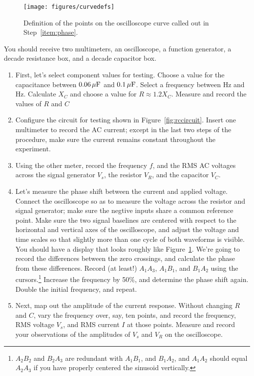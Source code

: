 \documentclass[12pt]{article}
\begin{document}
\begin{figure}
  \centering
 \texttt{[image: figures/curvedefs]} 
  \caption{Definition of the points on the oscilloscope curve called
    out in Step~\ref{item:phase}.} 
  \label{fig:curvedefs}
\end{figure}
You should receive two multimeters, an oscilloscope, a function
generator, a decade resistance box, and a decade capacitor box.

\begin{enumerate}
\item First, let's select component values for testing.  Choose a
  value for the capacitance between $\unit[0.06]{\mu F}$ and
  $\unit[0.1]{\mu F}$.  Select a frequency between \unit[300]{Hz} and
  \unit[600]{Hz}.  Calculate $X_C$ and choose a value for $R \approx
  1.2 X_C$.  Measure and record the values of $R$ and $C$
\item Configure the circuit for testing shown in
  Figure~\ref{fig:rccircuit}.  Insert one multimeter to record the AC
  current; except in the last two steps of the procedure, make sure
  the current remains constant throughout the experiment.
\item Using the other meter, record the frequency $f$, and the RMS AC
  voltages across the signal generator $V_s$, the resistor $V_R$, and
  the capacitor $V_C$.
\item \label{item:phase} Let's measure the phase shift between the
  current and applied voltage.  Connect the oscilloscope so as to
  measure the voltage across the resistor and signal generator; make
  sure the negtive inputs share a common reference point.  Make sure
  the two signal baselines are centered with respect to the horizontal
  and vertical axes of the oscilloscope, and adjust the voltage and
  time scales so that slightly more than one cycle of both waveforms
  is visible.  You should have a display that looks roughly like
  Figure~\ref{fig:curvedefs}.  We're going to record the differences
  between the zero crossings, and calculate the phase from these
  differences.  Record (at least!) $A_1A_3$, $A_1B_1$, and $B_1A_2$
  using the cursors.\footnote{$A_2B_2$ and $B_2A_3$ are redundant with
    $A_1B_1$, and $B_1A_2$, and $A_1A_2$ should equal $A_2A_3$ if you
    have properly centered the sinusoid vertically.}  Increase the
  frequency by 50\%, and determine the phase shift again.  Double the
  initial frequency, and repeat.
\item \label{item:current} Next, map out the amplitude of the current
  response.  Without changing $R$ and $C$, vary the frequency over,
  say, ten points, and record the frequency, RMS voltage $V_s$, and
  RMS current $I$ at those points.  Measure and record your
  observations of the amplitudes of $V_s$ and $V_R$ on the
  oscilloscope.
\end{enumerate}
\end{document}
